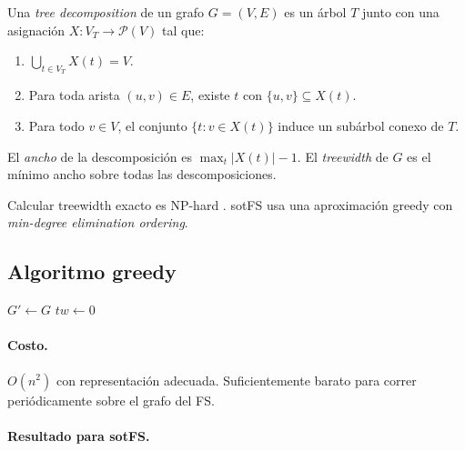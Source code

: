 \begin{defn}
\label{def:tree-decomposition}
Una \emph{tree decomposition} de un grafo $G = (V, E)$ es un árbol $T$
junto con una asignación $X: V_T \to \mathcal{P}(V)$ tal que:
\begin{enumerate}
  \item $\bigcup_{t \in V_T} X(t) = V$.
  \item Para toda arista $(u, v) \in E$, existe $t$ con
    $\{u, v\} \subseteq X(t)$.
  \item Para todo $v \in V$, el conjunto $\{t : v \in X(t)\}$ induce
    un subárbol conexo de $T$.
\end{enumerate}
El \emph{ancho} de la descomposición es $\max_t |X(t)| - 1$. El
\emph{treewidth} de $G$ es el mínimo ancho sobre todas las
descomposiciones.
\end{defn}

Calcular treewidth exacto es NP-hard \cite{Bodlaender1993}. sotFS usa
una aproximación greedy con \emph{min-degree elimination ordering}.

\subsection*{Algoritmo greedy}

\begin{algorithm}[H]
\SetAlgoLined
{}
\caption{\textsc{GreedyMinDegreeTreewidth}}\label{alg:treewidth}

$G' \gets G$
$\mathit{tw} \gets 0$\;
\;
\end{algorithm}

\paragraph{Costo.} $O(n^2)$ con representación adecuada. Suficientemente
barato para correr periódicamente sobre el grafo del FS.

\paragraph{Resultado para sotFS.}

